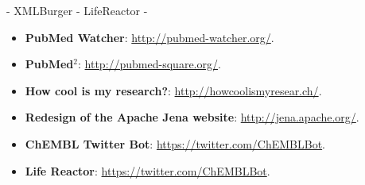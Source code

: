 - XMLBurger
- LifeReactor
- 

\begin{itemize}
  \item \textbf{PubMed Watcher}: \url{http://pubmed-watcher.org/}.
  \item \textbf{PubMed$^{2}$}: \url{http://pubmed-square.org/}.
  \item \textbf{How cool is my research?}: \url{http://howcoolismyresear.ch/}.
  \item \textbf{Redesign of the Apache Jena website}: \url{http://jena.apache.org/}.
  \item \textbf{ChEMBL Twitter Bot}: \url{https://twitter.com/ChEMBLBot}.
  \item \textbf{Life Reactor}: \url{https://twitter.com/ChEMBLBot}.
\end{itemize}
